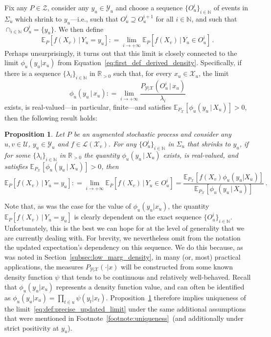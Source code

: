 \documentclass[3p]{elsarticle}
\newtheorem{proposition}[theorem]{Proposition}
\newcommand{\nats}{\mathbb{N}}
\newcommand{\reals}{\mathbb{R}}
\newcommand{\realspos}{\reals_{>0}}
\newcommand{\states}{\mathcal{X}}
\newcommand{\observs}{\mathcal{Y}}
\newcommand{\gambles}{\mathcal{L}}
\newcommand{\coloneqq}{:\!=}
\begin{document}
Fix any $P\in\mathcal{Z}$, consider any $y_u\in\observs_u$ and choose a sequence $\{O_u^i\}_{i\in\nats}$ of events in $\Sigma_u$ which shrink to $y_u$---i.e., such that $O_u^i\supseteq O_u^{i+1}$ for all $i\in\nats$, and such that $\cap_{i\in\nats} O_u^i=\{y_u\}$. We then define
\begin{equation}\label{eq:def:precise_updated_limit}
\mathbb{E}_P[f(X_v)\,\vert\,Y_u=y_u] \coloneqq \lim_{i\to+\infty} \mathbb{E}_P[f(X_v)\,\vert\,Y_u\in O_u^i]\,.
\end{equation}
Perhaps unsurprisingly, it turns out that this limit is closely connected to the limit $\phi_u(y_u\vert x_u)$ from Equation~\eqref{eq:first_def_derived_density}. Specifically, if there is a sequence $\{\lambda_i\}_{i\in\nats}$ in $\realspos$ such that, for every $x_u\in\states_u$, the limit
\begin{equation*}
\phi_u(y_u\,\vert\, x_u) \coloneqq \lim_{i\to+\infty}\frac{P_{\observs\vert\states}(O_u^i\,\vert\, x_u)}{\lambda_i}
\end{equation*}
exists, is real-valued---in particular, finite---and satisfies $\mathbb{E}_{P_\states}[\phi_u(y_u\,\vert\,X_u)]>0$, then the following result holds:
\begin{proposition}\label{prop:precise_bayes_rule_densities}
Let $P$ be an augmented stochastic process and consider any $u,v\in\mathcal{U}$, $y_u\in\observs_u$ and $f\in\gambles(\states_v)$. For any $\{O_u^i\}_{i\in\nats}$ in $\Sigma_u$ that shrinks to $y_u$, if for some $\{\lambda_i\}_{i\in\nats}$ in $\realspos$ the quantity $\phi_u(y_u\,\vert\,X_u)$ exists, is real-valued, and satisfies $\mathbb{E}_{P_\states}[\phi_u(y_u\,\vert\,X_u)]>0$, then
\begin{equation}\label{eq:updated_expectation_is_limit}
\mathbb{E}_P[f(X_v)\,\vert\,Y_u=y_u] \coloneqq \lim_{i\to+\infty} \mathbb{E}_P[f(X_v)\,\vert\,Y_u\in O_u^i] = \frac{\mathbb{E}_{P_\states}[f(X_v)\phi_u(y_u\vert X_u)]}{\mathbb{E}_{P_\states}[\phi_u(y_u\,\vert\,X_u)]}\,.
\end{equation}
\end{proposition}
Note that, as was the case for the value of $\phi_u(y_u\vert x_u)$, the quantity $\mathbb{E}_P[f(X_v)\,\vert\,Y_u=y_u]$ is clearly dependent on the exact sequence $\{O_u^i\}_{i\in\nats}$. Unfortunately, this is the best we can hope for at the level of generality that we are currently dealing with. 
For brevity, we nevertheless omit from the notation the updated expectation's dependency on this sequence. We do this because, as was noted in Section~\ref{subsec:low_marg_density}, in many (or, most) practical applications, the measures $P_{\observs\vert\states}(\cdot\vert x)$ will be constructed from some known density function $\psi$ that tends to be continuous and relatively well-behaved. Recall that $\phi_u(y_u\vert x_u)$ represents a density function value, and can often be identified as $\phi_u(y_u\vert x_u)=\prod_{t\in u}\psi(y_t\vert x_t)$. Proposition~\ref{prop:precise_bayes_rule_densities} therefore implies uniqueness of the limit~\eqref{eq:def:precise_updated_limit} under the same additional assumptions that were mentioned in Footnote~\ref{footnote:uniqueness}~(and additionally under strict positivity at $y_u$). %
\end{document}
